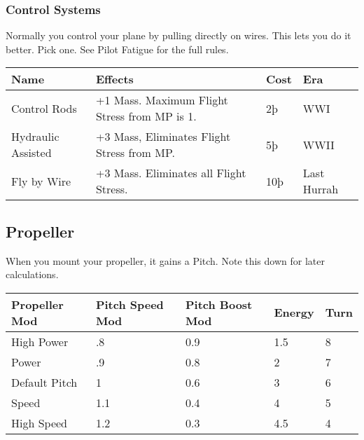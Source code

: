 \documentclass{article}
\begin{document}
\subsubsection{Control Systems}
\label{_Control_Systems}

Normally you control your plane by pulling directly on wires. This lets
you do it better. Pick one. See Pilot Fatigue for the full rules.

\begin{tabular}{|l|l|l|l|}
    \hline
    Name               & Effects                                      & Cost & Era  \\\hline
    Control Rods       & +1 Mass. Maximum Flight Stress from MP is 1. & 2þ   &
    WWI                                                                             \\\hline
    Hydraulic Assisted & +3 Mass, Eliminates Flight Stress from MP.   & 5þ   &
    WWII                                                                            \\\hline
    Fly by Wire        & +3 Mass. Eliminates all Flight Stress.       & 10þ  & Last
    Hurrah                                                                          \\\hline
\end{tabular}

\subsection{Propeller}
\label{_Propeller}

When you mount your propeller, it gains a Pitch. Note this down for
later calculations.

\begin{tabular}{|l|l|l|l|l|}
    \hline
    Propeller Mod & Pitch Speed Mod & Pitch Boost Mod & Energy & Turn \\\hline
    High Power    & .8              & 0.9             & 1.5    & 8    \\\hline
    Power         & .9              & 0.8             & 2      & 7    \\\hline
    Default Pitch & 1               & 0.6             & 3      & 6    \\\hline
    Speed         & 1.1             & 0.4             & 4      & 5    \\\hline
    High Speed    & 1.2             & 0.3             & 4.5    & 4    \\\hline
\end{tabular}
\end{document}
